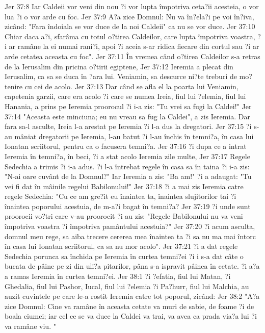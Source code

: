 Jer 37:8  Iar Caldeii vor veni din nou ?i vor lupta împotriva ceta?ii acesteia, o vor lua ?i o vor arde cu foc.
Jer 37:9  A?a zice Domnul: Nu va în?ela?i pe voi în?iva, zicând: "Fara îndoiala se vor duce de la noi Caldeii" ca nu se vor duce.
Jer 37:10  Chiar daca a?i, sfarâma cu totul o?tirea Caldeilor, care lupta împotriva voastra, ?i ar ramâne la ei numai rani?i, apoi ?i aceia s-ar ridica fiecare din cortul sau ?i ar arde cetatea aceasta cu foc".
Jer 37:11  În vremea când o?tirea Caldeilor s-a retras de la Ierusalim din pricina o?tirii egiptene,
Jer 37:12  Ieremia a plecat din Ierusalim, ca sa se duca în ?ara lui. Veniamin, sa descurce ni?te treburi de mo?tenire cu cei de acolo.
Jer 37:13  Dar când se afla el la poarta lui Veniamin, capetenia garzii, care era acolo ?i care se numea Ireia, fiul lui ?elemia, fiul lui Hanania, a prins pe Ieremia proorocul ?i i-a zis: "Tu vrei sa fugi la Caldei!"
Jer 37:14  "Aceasta este minciuna; eu nu vreau sa fug la Caldei", a zis Ieremia. Dar fara sa-l asculte, Ireia l-a arestat pe Ieremia ?i l-a dus la dregatori.
Jer 37:15  ?i s-au mâniat dregatorii pe Ieremia, l-au batut ?i l-au închis în temni?a, în casa lui Ionatan scriitorul, pentru ca o facusera temni?a.
Jer 37:16  ?i dupa ce a intrat Ieremia în temni?a, în beci, ?i a stat acolo Ieremia zile multe,
Jer 37:17  Regele Sedechia a trimis ?i i-a adus. ?i l-a întrebat regele în casa sa în taina ?i i-a zis: "N-ai oare cuvânt de la Domnul?" Iar Ieremia a zis: "Ba am!" ?i a adaugat: "Tu vei fi dat în mâinile regelui Babilonului!"
Jer 37:18  ?i a mai zis Ieremia catre regele Sedechia: "Cu ce am gre?it eu înaintea ta, înaintea slujitorilor tai ?i înaintea poporului acestuia, de m-a?i bagat în temni?a?
Jer 37:19  ?i unde sunt proorocii vo?tri care v-au proorocit ?i au zis: "Regele Babilonului nu va veni împotriva voastra ?i împotriva pamântului acestuia?"
Jer 37:20  ?i acum asculta, domnul meu rege, sa aiba trecere cererea mea înaintea ta ?i sa nu ma mai întorc în casa lui Ionatan scriitorul, ca sa nu mor acolo".
Jer 37:21  ?i a dat regele Sedechia porunca sa închida pe Ieremia în curtea temni?ei ?i i s-a dat câte o bucata de pâine pe zi din uli?a pitarilor, pâna s-a ispravit pâinea în cetate. ?i a?a a ramas Ieremia în curtea temni?ei.
Jer 38:1  ?i ?efatia, fiul lui Matan, ?i Ghedalia, fiul lui Pashor, Iucal, fiul lui ?elemia ?i Pa?hurr, fiul lui Malchia, au auzit cuvintele pe care le-a rostit Ieremia catre tot poporul, zicând:
Jer 38:2  "A?a zice Domnul: Cine va ramâne în aceasta cetate va muri de sabie, de foame ?i de boala ciumei; iar cel ce se va duce la Caldei va trai, va avea ca prada via?a lui ?i va ramâne viu. "
